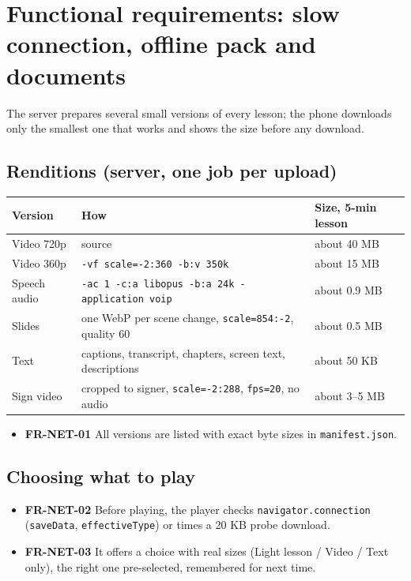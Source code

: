 \documentclass[11pt,a4paper]{article}
\newcommand{\code}[1]{\texttt{#1}}
\newcommand{\req}[1]{\textbf{#1}}
\begin{document}
\section{Functional requirements: slow connection, offline pack and documents}

The server prepares several small versions of every lesson; the phone downloads only the smallest one that works and shows the size before any download.

\subsection{Renditions (server, one job per upload)}
\begin{xltabular}{\textwidth}{@{}l X l@{}}
\toprule
\textbf{Version} & \textbf{How} & \textbf{Size, 5-min lesson} \\
\midrule
\endhead
Video 720p & source & about 40 MB \\
Video 360p & \code{-vf scale=-2:360 -b:v 350k} & about 15 MB \\
Speech audio & \code{-ac 1 -c:a libopus -b:a 24k -application voip} & about 0.9 MB \\
Slides & one WebP per scene change, \code{scale=854:-2}, quality 60 & about 0.5 MB \\
Text & captions, transcript, chapters, screen text, descriptions & about 50 KB \\
Sign video & cropped to signer, \code{scale=-2:288}, \code{fps=20}, no audio & about 3--5 MB \\
\bottomrule
\end{xltabular}
\begin{itemize}
  \item \req{FR-NET-01} All versions are listed with exact byte sizes in \code{manifest.json}.
\end{itemize}

\subsection{Choosing what to play}
\begin{itemize}
  \item \req{FR-NET-02} Before playing, the player checks \code{navigator.connection} (\code{saveData}, \code{effectiveType}) or times a 20 KB probe download.
  \item \req{FR-NET-03} It offers a choice with real sizes (Light lesson / Video / Text only), the right one pre-selected, remembered for next time.
\end{itemize}
\end{document}
